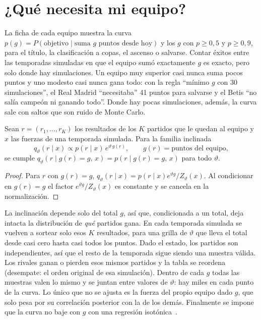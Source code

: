 \section{¿Qué necesita mi equipo?}
\label{sec:necesita}

La ficha de cada equipo muestra la curva $p(g)=P(\text{objetivo}\mid\text{suma }g\text{ puntos desde hoy})$ y los $g$ con $p\ge0{,}5$ y $p\ge0{,}9$, para el título, la clasificación a copas, el ascenso o salvarse. Contar éxitos entre las temporadas simuladas en que el equipo sumó exactamente $g$ es exacto, pero solo donde hay simulaciones. Un equipo muy superior casi nunca suma pocos puntos y uno modesto casi nunca gana todo: con la regla ``mínimo $g$ con 30 simulaciones'', el Real Madrid ``necesitaba'' 41 puntos para salvarse y el Betis ``no salía campeón ni ganando todo''. Donde hay pocas simulaciones, además, la curva sale con saltos que son ruido de Monte Carlo.

\begin{proposicion} \dem
Sean $r=(r_1,\dots,r_K)$ los resultados de los $K$ partidos que le quedan al equipo y $x$ las fuerzas de una temporada simulada. Para la familia inclinada
\[
q_\vartheta(r\mid x)\propto p(r\mid x)\,e^{\vartheta\,g(r)},\qquad g(r)=\text{puntos del equipo},
\]
se cumple $q_\vartheta(r\mid g(r)=g,\,x)=p(r\mid g(r)=g,\,x)$ para todo $\vartheta$.
\end{proposicion}

\begin{proof}
Para $r$ con $g(r)=g$, $q_\vartheta(r\mid x)=p(r\mid x)e^{\vartheta g}/Z_\vartheta(x)$. Al condicionar en $g(r)=g$ el factor $e^{\vartheta g}/Z_\vartheta(x)$ es constante y se cancela en la normalización.
\end{proof}

La inclinación depende solo del total $g$, así que, condicionada a un total, deja intacta la distribución de \emph{qué} partidos gana. En cada temporada simulada se vuelven a sortear solo esos $K$ resultados, para una grilla de $\vartheta$ que lleva el total desde casi cero hasta casi todos los puntos. Dado el estado, los partidos son independientes, así que el resto de la temporada sigue siendo una muestra válida. Los rivales ganan o pierden esos mismos partidos y la tabla se reordena (desempate: el orden original de esa simulación). Dentro de cada $g$ todas las muestras valen lo mismo y se juntan entre valores de $\vartheta$: hay miles en cada punto de la curva. Lo único que no se ajusta es la fuerza del propio equipo dado $g$, que solo pesa por su correlación posterior con la de los demás. Finalmente se impone que la curva no baje con $g$ con una regresión isotónica~\cite{barlow1972}.


